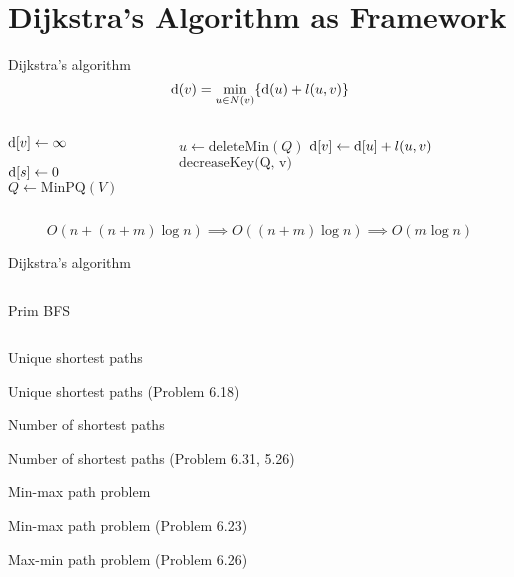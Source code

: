 \section{Dijkstra's Algorithm as Framework}

\begin{frame}{Dijkstra's algorithm}
  \[
	\text{d}(v) = \min_{u \in N(v)} \{\text{d}(u) + l(u,v)\}
  \]
  
  \begin{columns}
	  \begin{algorithmic}
		  \State $\text{d}[v] \gets \infty$
		\EndFor

		\State $\text{d}[s] \gets 0$
		\Statex
		\State $Q \gets \text{MinPQ}(V)$
	  \end{algorithmic}
	\column{0.55\textwidth}
	  \begin{algorithmic}
		\While{$Q \neq \emptyset$}
		  \State $u \gets \text{deleteMin}(Q)$
		  \ForAll{$(u,v) \in E \land v \in Q$}
			\If{$\dist[v] > \dist[u] + l(u,v)$}
			  \State $\text{d}[v] \gets \text{d}[u] + l(u,v)$
			  \State $\text{decreaseKey(Q, v)}$
			\EndIf
		  \EndFor
		\EndWhile
	  \end{algorithmic}
  \end{columns}

  \vspace{0.50cm}
  \[
	O(n + (n+m) \log n) \implies O((n + m) \log n) \implies O(m \log n)
  \]
\end{frame}
\begin{frame}{Dijkstra's algorithm}
  \begin{columns}
	  Prim
	  BFS
  \end{columns}
\end{frame}
\begin{frame}{Unique shortest paths}
  \begin{exampleblock}{Unique shortest paths (Problem 6.18)}
  \end{exampleblock}
\end{frame}
\begin{frame}{Number of shortest paths}
  \begin{exampleblock}{Number of shortest paths (Problem 6.31, 5.26)}
  \end{exampleblock}
\end{frame}
\begin{frame}{Min-max path problem}
  \begin{exampleblock}{Min-max path problem (Problem 6.23)}
  \end{exampleblock}
\end{frame}
\begin{frame}{Max-min path problem (Problem 6.26)}
  \begin{exampleblock}{}
  \end{exampleblock}
\end{frame}
\begin{frame}{}
  \begin{exampleblock}{}
  \end{exampleblock}
\end{frame}
